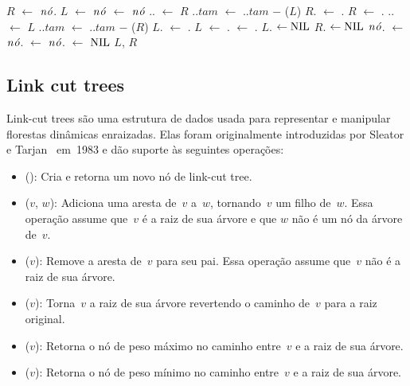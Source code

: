 \begin{algorithm}
\caption{\treapSplitRight($\node$)}
\label{Algo:TREAPsplitRight}
\begin{algorithmic}[1]
\State $R$ $\gets $ $\node$.
\State $L$ $\gets $ $\node$ \label{Algo:TREAPsplitRight:linha:atribuicao}
\State {} $\gets$ $\node$
    \State {}.. $\gets$ $R$
    \State {}..$tam$ $\gets$ ..$tam$ $\mathit{-}$ \treapGetSize($L$)
    \State $R$. $\gets$ .
    \EndIf
    \State $R$ $\gets$ .
  \Else
    \State {}.. $\gets$ $L$ 
    \State {}..$tam$ $\gets$ ..$tam$ $\mathit{-}$ \treapGetSize($R$)
    \State $L$. $\gets$ .
    \EndIf
    \State $L$ $\gets$ .
  \EndIf
  \State {} $\gets$ .
\EndWhile
{} $L$. $\gets\text{NIL}$\EndIf
{} $R$. $\gets\text{NIL}$\EndIf
\State $\node$. $\gets $ $\node$. $\gets$ $\node$. $\gets$ $\text{NIL}$
\State\Return $L$, $R$
\end{algorithmic}
\end{algorithm}

\subsection{Link cut trees}
\label{sec:linkcuttree}
Link-cut trees são uma estrutura de dados usada para representar e manipular florestas dinâmicas enraizadas.
Elas foram originalmente introduzidas por Sleator e Tarjan~\cite{SleatroTarjanLinkCutTree1983,} em~1983 e dão suporte às seguintes operações:
\begin{itemize}
\item \linkcutCreate(): Cria e retorna um novo nó de link-cut tree.
\item \linkcutAddEdge($v$, $w$): Adiciona uma aresta de~$v$ a~$w$, tornando~$v$ um filho de~$w$. Essa operação assume que~$v$ é a raiz de sua árvore e que $w$ não é um nó da árvore de~$v$.
\item \linkcutDelEdge($v$): Remove a aresta de~$v$ para seu pai.
	Essa operação assume que~$v$ não é a raiz de sua árvore.
\item \linkcutEvert($v$): Torna~$v$ a raiz de sua árvore revertendo o caminho de~$v$ para a raiz original.
\item \linkcutMax($v$): Retorna o nó de peso máximo no caminho entre~$v$ e a raiz de sua árvore.
\item \linkcutMin($v$): Retorna o nó de peso mínimo no caminho entre~$v$ e a raiz de sua árvore.
\end{itemize}


